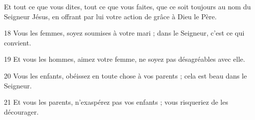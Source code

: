 Et tout ce que vous dites, tout ce que vous faites, que ce soit toujours au nom du Seigneur Jésus, en offrant par lui votre action de grâce à Dieu le Père.

18 Vous les femmes, soyez soumises à votre mari ; dans le Seigneur, c’est ce qui convient.

19 Et vous les hommes, aimez votre femme, ne soyez pas désagréables avec elle.

20 Vous les enfants, obéissez en toute chose à vos parents ; cela est beau dans le Seigneur.

21 Et vous les parents, n’exaspérez pas vos enfants ; vous risqueriez de les décourager.